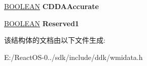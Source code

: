 \begin{DoxyCompactItemize}
\item 
\mbox{\label{struct___r_e_d_b_o_o_k___w_m_i___s_t_d___d_a_t_a_a6ed06a55e3c760aa51c3189eb93b61a4}} 
\hyperlink{_processor_bind_8h_a112e3146cb38b6ee95e64d85842e380a}{B\+O\+O\+L\+E\+AN} {\bfseries C\+D\+D\+A\+Accurate}
\item 
\mbox{\label{struct___r_e_d_b_o_o_k___w_m_i___s_t_d___d_a_t_a_a8c24d70e665a5040294e2f6ece9f55d4}} 
\hyperlink{_processor_bind_8h_a112e3146cb38b6ee95e64d85842e380a}{B\+O\+O\+L\+E\+AN} {\bfseries Reserved1}
\end{DoxyCompactItemize}


该结构体的文档由以下文件生成\+:\begin{DoxyCompactItemize}
\item 
E\+:/\+React\+O\+S-\/0../sdk/include/ddk/wmidata.\+h\end{DoxyCompactItemize}
